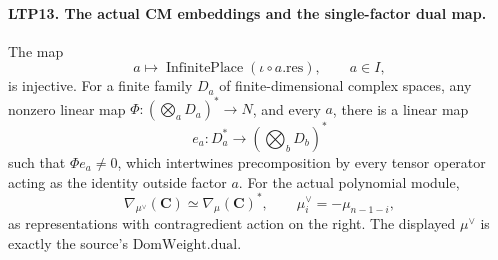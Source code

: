 \documentclass[11pt,a4paper]{article}
\numberwithin{equation}{section}
\theoremstyle{remark}\newtheorem{remark}[theorem]{Remark}
\begin{document}
\paragraph{LTP13. The actual CM embeddings and the single-factor dual map.}
\label{claim:LTP13}
The map
\[
       a\longmapsto\operatorname{InfinitePlace}
                       (\iota\circ a.\mathrm{res}),\qquad a\in I,
\]
is injective.  For a finite family \(D_a\) of finite-dimensional
complex spaces, any nonzero linear map
\(\Phi:(\bigotimes_aD_a)^*\to N\), and every \(a\), there is a
linear map
\[
                 e_a:D_a^*\longrightarrow(\bigotimes_bD_b)^*
\]
such that \(\Phi e_a\ne0\), which intertwines precomposition by
every tensor operator acting as the identity outside factor \(a\).
For the actual polynomial module,
\[
 \nabla_{\mu^\vee}(\mathbf C)
       \simeq\nabla_\mu(\mathbf C)^*,\qquad
              \mu^\vee_i=-\mu_{n-1-i},
\]
as representations with contragredient action on the right.
The displayed \(\mu^\vee\) is exactly the source's
\(\mathrm{DomWeight.dual}\).
\end{document}
